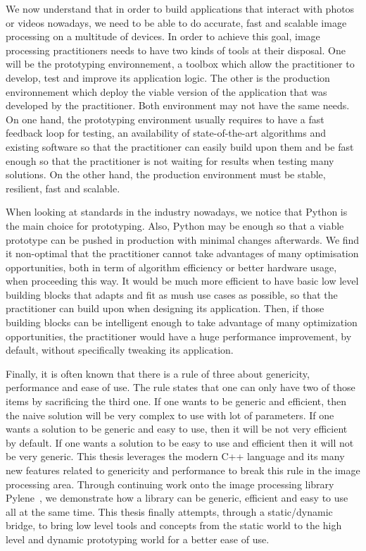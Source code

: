 We now understand that in order to build applications that interact with photos or videos nowadays, we need to be able
to do accurate, fast and scalable image processing on a multitude of devices. In order to achieve this goal, image
processing practitioners needs to have two kinds of tools at their disposal. One will be the prototyping environnement,
a toolbox which allow the practitioner to develop, test and improve its application logic. The other is the production
environnement which deploy the viable version of the application that was developed by the practitioner. Both
environment may not have the same needs. On one hand, the prototyping environment usually requires to have a fast
feedback loop for testing, an availability of state-of-the-art algorithms and existing software so that the practitioner
can easily build upon them and be fast enough so that the practitioner is not waiting for results when testing many
solutions. On the other hand, the production environment must be stable, resilient, fast and scalable.

When looking at standards in the industry nowadays, we notice that Python is the main choice for prototyping. Also,
Python may be enough so that a viable prototype can be pushed in production with minimal changes afterwards. We find it
non-optimal that the practitioner cannot take advantages of many optimisation opportunities, both in term of algorithm
efficiency or better hardware usage, when proceeding this way. It would be much more efficient to have basic low level
building blocks that adapts and fit as mush use cases as possible, so that the practitioner can build upon when
designing its application. Then, if those building blocks can be intelligent enough to take advantage of many
optimization opportunities, the practitioner would have a huge performance improvement, by default, without specifically
tweaking its application.

Finally, it is often known that there is a rule of three about genericity, performance and ease of use. The rule states
that one can only have two of those items by sacrificing the third one. If one wants to be generic and efficient, then
the naive solution will be very complex to use with lot of parameters. If one wants a solution to be generic and easy to
use, then it will be not very efficient by default. If one wants a solution to be easy to use and efficient then it will
not be very generic. This thesis leverages the modern C++ language and its many new features related to genericity and
performance to break this rule in the image processing area. Through continuing work onto the image processing library
Pylene~\cite{carlinet.2018.pylena}, we demonstrate how a library can be generic, efficient and easy to use all at the
same time. This thesis finally attempts, through a static/dynamic bridge, to bring low level tools and concepts from the
static world to the high level and dynamic prototyping world for a better ease of use.

